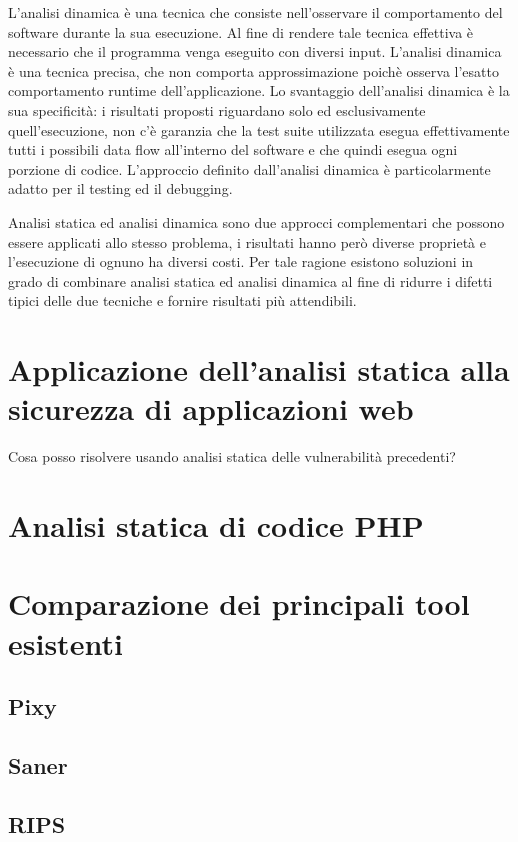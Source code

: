 L'analisi dinamica è una tecnica che consiste nell'osservare il comportamento del software durante la sua esecuzione. Al fine di rendere tale tecnica effettiva è necessario che il programma venga eseguito con diversi input. L'analisi dinamica è una tecnica precisa, che non comporta approssimazione poichè osserva l'esatto comportamento runtime dell'applicazione.
Lo svantaggio dell'analisi dinamica è la sua specificità: i risultati proposti riguardano solo ed esclusivamente quell'esecuzione, non c'è garanzia che la test suite utilizzata esegua effettivamente tutti i possibili data flow all'interno del software e che quindi esegua ogni porzione di codice. L'approccio definito dall'analisi dinamica è particolarmente adatto per il testing ed il debugging.

Analisi statica ed analisi dinamica sono due approcci complementari che possono essere applicati allo stesso problema, i risultati hanno però diverse proprietà e l'esecuzione di ognuno ha diversi costi. Per tale ragione esistono soluzioni in grado di combinare analisi statica ed analisi dinamica al fine di ridurre i difetti tipici delle due tecniche e fornire risultati più attendibili.

\chapter{Applicazione dell'analisi statica alla sicurezza di applicazioni web}
Cosa posso risolvere usando analisi statica delle vulnerabilità precedenti?

\chapter{Analisi statica di codice PHP}

\chapter{Comparazione dei principali tool esistenti}

\section{Pixy}

\section{Saner}

\section{RIPS}

